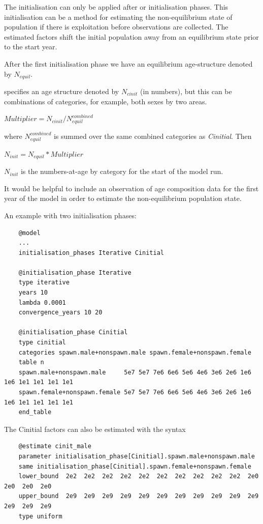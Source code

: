 The  initialisation can only be applied after  or  initialisation phases. This initialisation can be a method for estimating the non-equilibrium state of population if there is exploitation before observations are collected. The estimated  factors shift the initial population away from an equilibrium state prior to the start year.

After the first initialisation phase we have an equilibrium age-structure denoted by $N_{equil}$.

 specifies an age structure denoted by $N_{cinit}$ (in numbers), but this can be combinations of categories, for example, both sexes by two areas.

$Multiplier =  N_{cinit} / N_{equil}^{combined}$

where $N_{equil}^{combined} $ is summed over the same combined categories as \textit{Cinitial}. Then

$N_{init} =  N_{equil} * Multiplier $

$N_{init}$ is the numbers-at-age by category for the start of the model run.

It would be helpful to include an observation of age composition data for the first year of the model in order to estimate the non-equilibrium population state.

An example with two initialisation phases:

{\small{\begin{verbatim}
	@model
	...
	initialisation_phases Iterative Cinitial

	@initialisation_phase Iterative
	type iterative
	years 10
	lambda 0.0001
	convergence_years 10 20

	@initialisation_phase Cinitial
	type cinitial
	categories spawn.male+nonspawn.male spawn.female+nonspawn.female
	table n
	spawn.male+nonspawn.male     5e7 5e7 7e6 6e6 5e6 4e6 3e6 2e6 1e6 1e6 1e1 1e1 1e1 1e1
	spawn.female+nonspawn.female 5e7 5e7 7e6 6e6 5e6 4e6 3e6 2e6 1e6 1e6 1e1 1e1 1e1 1e1
	end_table
\end{verbatim}}}

The Cinitial factors can also be estimated with the syntax

{\small{\begin{verbatim}
	@estimate cinit_male
	parameter initialisation_phase[Cinitial].spawn.male+nonspawn.male
	same initialisation_phase[Cinitial].spawn.female+nonspawn.female
	lower_bound  2e2  2e2  2e2  2e2  2e2  2e2  2e2  2e2  2e2  2e2  2e0  2e0  2e0  2e0
	upper_bound  2e9  2e9  2e9  2e9  2e9  2e9  2e9  2e9  2e9  2e9  2e9  2e9  2e9  2e9
	type uniform
	\end{verbatim}}}

